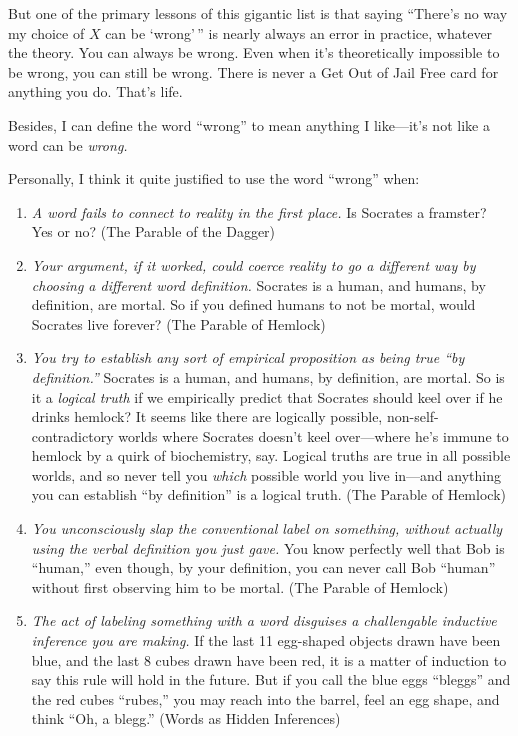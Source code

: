 {{{
 But one of the primary lessons of this gigantic list is that
saying ``There's no way my choice of $X$
can be `wrong'\,'' is
nearly always an error in practice, whatever the theory. You can always
be wrong. Even when it's theoretically impossible to be
wrong, you can still be wrong. There is never a Get Out of Jail Free
card for anything you do. That's life.}

{
 Besides, I can define the word
``wrong'' to mean anything I
like---it's not like a word can be \textit{wrong.}}

{
 Personally, I think it quite justified to use the word
``wrong'' when:}

\begin{enumerate}
\item {
 \textit{A word fails to connect to reality in the first place.} Is
Socrates a framster? Yes or no? (The Parable of the Dagger)}

\item {
 \textit{Your argument, if it worked, could coerce reality to go a
different way by choosing a different word definition.} Socrates is a
human, and humans, by definition, are mortal. So if you defined humans
to not be mortal, would Socrates live forever? (The Parable of
Hemlock)}

\item {
 \textit{You try to establish any sort of empirical proposition as
being true ``by definition.''}
Socrates is a human, and humans, by definition, are mortal. So is it a
\textit{logical truth} if we empirically predict that Socrates should
keel over if he drinks hemlock? It seems like there are logically
possible, non-self-contradictory worlds where Socrates
doesn't keel over---where he's immune
to hemlock by a quirk of biochemistry, say. Logical truths are true in
all possible worlds, and so never tell you \textit{which} possible
world you live in---and anything you can establish
``by definition'' is a logical
truth. (The Parable of Hemlock)}

\item {
 \textit{You unconsciously slap the conventional label on
something, without actually using the verbal definition you just gave.}
You know perfectly well that Bob is
``human,'' even though, by your
definition, you can never call Bob
``human'' without first observing
him to be mortal. (The Parable of Hemlock)}

\item {
 \textit{The act of labeling something with a word disguises a
challengable inductive inference you are making.} If the last 11
egg-shaped objects drawn have been blue, and the last 8 cubes drawn
have been red, it is a matter of induction to say this rule will hold
in the future. But if you call the blue eggs
``bleggs'' and the red cubes
``rubes,'' you may reach into the
barrel, feel an egg shape, and think ``Oh, a
blegg.'' (Words as Hidden Inferences)}


\end{enumerate}}}
